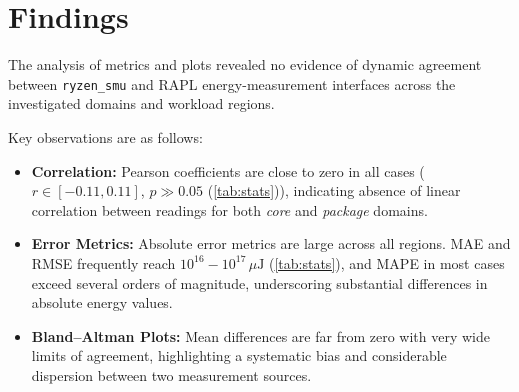 \section{Findings}
\label{sec:findings}


The analysis of metrics and plots revealed no evidence of dynamic agreement
between \texttt{ryzen\_smu} and \gls{RAPL} energy-measurement interfaces
across the investigated domains and workload regions.

Key observations are as follows:

\begin{itemize}
  \item \textbf{Correlation:} Pearson coefficients are close to
  zero in all cases (\(r \in [-0.11,0.11]\), \(p \gg 0.05\) (\cref{tab:stats})),
  indicating absence of linear correlation between readings for both \emph{core}
  and \emph{package} domains.

  \item \textbf{Error Metrics:} Absolute error metrics are large across
  all regions. \gls{MAE} and \gls{RMSE} frequently reach \(10^{16}\!-
  \!10^{17}\,\mu\mathrm{J}\) (\cref{tab:stats}), and \gls{MAPE} in most cases
  exceed several orders of magnitude, underscoring substantial differences in
  absolute energy values.

  \item \textbf{Bland–Altman Plots:} Mean differences are
  far from zero with very wide limits of agreement, highlighting a systematic
  bias and considerable dispersion between two measurement sources.
\end{itemize}

